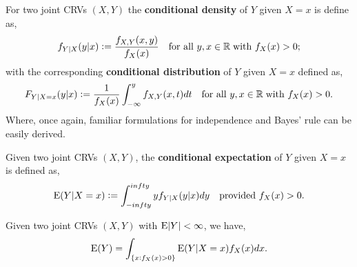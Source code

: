 \begin{definition}
    For two joint CRVs $(X,Y)$ the \textbf{conditional density} of $Y$ given $X=x$ is define as, \[
        f_{Y|X}(y|x):=\frac{f_{X,Y}(x,y)}{f_X(x)} \quad
        \text{\textcolor{black}{ for all }}y,x\in\mathbb{R} \;\text{\textcolor{black}{ with }} f_X(x)>0\textcolor{black}{;}
    \]
    with the corresponding \textbf{conditional distribution} of $Y$ given $X=x$ defined as, \[
        F_{Y|X=x}(y|x):=\frac{1}{f_X(x)}\int_{-\infty}^yf_{X,Y}(x,t)dt \quad
        \text{\textcolor{black}{ for all }}y,x\in\mathbb{R} \;\text{\textcolor{black}{ with }} f_X(x)>0\textcolor{black}{.}
    \]
    Where, once again, familiar formulations for independence and Bayes' rule can be easily derived.
\end{definition}

\begingroup\belowdisplayskip=-0pt
\begin{definition}
    Given two joint CRVs $(X,Y)$, the \textbf{conditional expectation} of $Y$ given $X=x$ is defined as, \[
        \mathrm{E}(Y|X=x):=\int_{-infty}^{infty}yf_{Y|X}(y|x)dy \quad
        \text{\textcolor{black}{ provided }}f_X(x)>0 \textcolor{black}{.}
    \]
\end{definition}

\begin{theorem}
    Given two joint CRVs $(X,Y)$ with $\mathrm{E}|Y|<\infty$, we have, \[
        \mathrm{E}(Y)=
        \int_{\{x:f_X(x)>0\}}\mathrm{E}(Y|X=x)f_X(x)dx\textcolor{black}{.}
    \]
\end{theorem}
\endgroup

